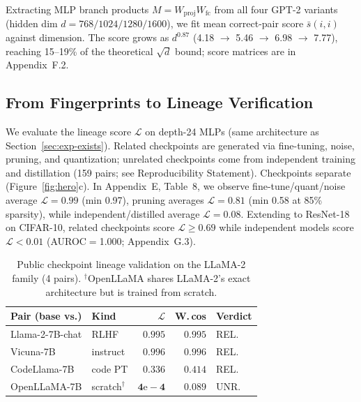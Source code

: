 \documentclass[letterpaper]{article}
\begin{document}
Extracting MLP branch products $M = W_{\mathrm{proj}} W_{\mathrm{fc}}$ from all four GPT-2 variants (hidden dim $d{=}768/1024/1280/1600$), we fit mean correct-pair score $\bar{s}(i,i)$ against dimension. The score grows as $d^{0.87}$ (4.18 $\to$ 5.46 $\to$ 6.98 $\to$ 7.77), reaching 15--19\% of the theoretical $\sqrt{d}$ bound; score matrices are in Appendix~F.2.

\subsection{From Fingerprints to Lineage Verification}\label{sec:exp-verify}

We evaluate the lineage score $\mathcal{L}$ on depth-24 MLPs (same architecture as Section~\ref{sec:exp-exists}). Related checkpoints are generated via fine-tuning, noise, pruning, and quantization; unrelated checkpoints come from independent training and distillation (159 pairs; see Reproducibility Statement). Checkpoints separate (Figure~\ref{fig:hero}c). In Appendix~E, Table~8, we observe fine-tune/quant/noise average $\mathcal{L}{=}0.99$ (min 0.97), pruning averages $\mathcal{L}{=}0.81$ (min 0.58 at 85\% sparsity), while independent/distilled average $\mathcal{L}{=}0.08$. Extending to ResNet-18 on CIFAR-10, related checkpoints score $\mathcal{L}{\geq}0.69$ while independent models score $\mathcal{L}{<}0.01$ (AUROC$=$1.000; Appendix~G.3).

\begin{table}[t]
\centering\footnotesize
\setlength{\tabcolsep}{3pt}
\renewcommand{\arraystretch}{1.1}
\begin{tabular}{@{}llrrl@{}}
\toprule
Pair (base vs.) & Kind & $\mathcal{L}$ & W.\,cos & Verdict \\
\midrule
Llama-2-7B-chat   & RLHF          & $\mathbf{0.995}$ & $0.995$ & REL. \\
Vicuna-7B         & instruct      & $\mathbf{0.996}$ & $0.996$ & REL. \\
CodeLlama-7B      & code PT       & $0.336$ & $\mathbf{0.414}$ & REL. \\
OpenLLaMA-7B      & scratch$^\dagger$ & $\mathbf{4\mathrm{e}{-}4}$ & $0.089$ & UNR. \\
\bottomrule
\end{tabular}
\caption{Public checkpoint lineage validation on the LLaMA-2 family (4 pairs). $^\dagger$OpenLLaMA shares LLaMA-2's exact architecture but is trained from scratch.}
\label{tab:real-llm}
\end{table}
\end{document}
